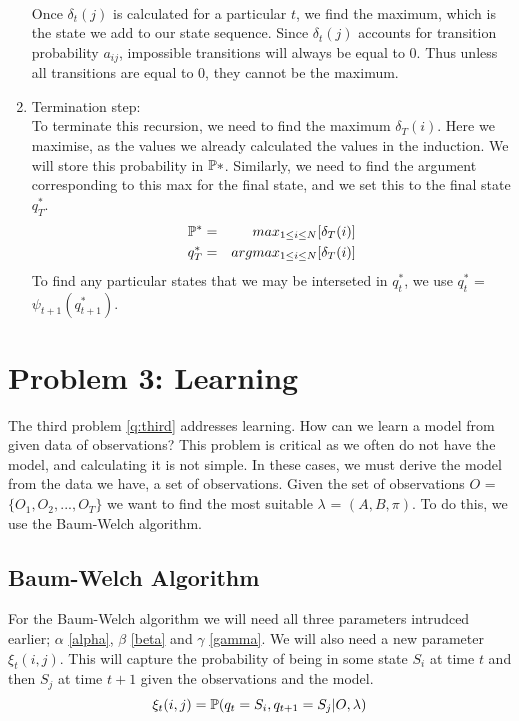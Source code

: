 \begin{enumerate}
\begin{center}
        \\
        Once $\delta_{t}(j)$ is calculated for a particular $t$, we find the maximum, which is the state we add to our state sequence. Since $\delta_{t}(j)$ accounts for transition probability $a_{ij}$, impossible transitions will always be equal to 0. Thus unless all transitions are equal to 0, they cannot be the maximum.
    \end{center}

    \item Termination step: \\
    To terminate this recursion, we need to find the maximum $\delta_{T}(i)$. Here we maximise, as the values we already calculated the values in the induction. We will store this probability in $\mathbb{P}*$. Similarly, we need to find the argument corresponding to this max for the final state, and we set this to the final state $q_T^*$.
    \begin{eqnarray}
        \mathbb{P}^* & = & max_{1 \leq i \leq N}[\delta_{T}(i)] \\
        q_T^*   & = & argmax_{1 \leq i \leq N}[\delta_{T}(i)]
    \end{eqnarray}
    To find any particular states that we may be interseted in $q_t^*$, we use $q_t^*$ = $\psi_{t+1}(q_{t+1}^*)$. 
\end{enumerate}



\section{Problem 3: Learning}
The third problem \ref{q:third} addresses learning. How can we learn a model from given data of observations? This problem is critical as we often do not have the model, and calculating it is not simple. In these cases, we must derive the model from the data we have, a set of observations. Given the set of observations $O$ = $\{O_1,O_2,...,O_T\}$ we want to find the most suitable $\lambda$ = $(A,B,\pi)$. To do this, we use the Baum-Welch algorithm.


\subsection{Baum-Welch Algorithm}
For the Baum-Welch algorithm we will need all three parameters intrudced earlier; $\alpha$ \ref{alpha}, $\beta$ \ref{beta} and $\gamma$ \ref{gamma}. We will also need a new parameter $\xi_t(i,j)$. This will capture the probability of being in some state $S_i$ at time $t$ and then $S_j$ at time $t+1$ given the observations and the model. 
\begin{equation}
    \xi_t(i,j) = \mathbb{P} (q_t = S_i, q_{t+1} = S_j | O, \lambda)
\end{equation} 

